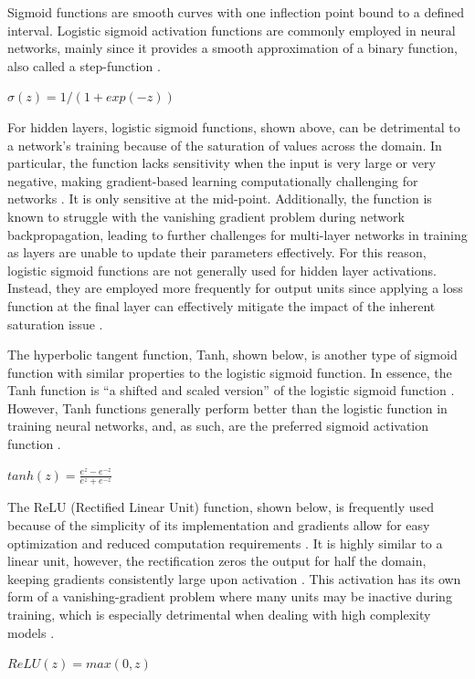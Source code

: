 \documentclass{article}
\begin{document}
Sigmoid functions are smooth curves with one inflection point bound to a defined interval. Logistic sigmoid activation functions are commonly employed in neural networks, mainly since it provides a smooth approximation of a binary function, also called a step-function \cite{lederer2021activation}. 
\newline
\newline
\centerline{$\sigma(z)=1/(1+exp(-z))$}
\newline

For hidden layers, logistic sigmoid functions, shown above, can be detrimental to a network’s training because of the saturation of values across the domain. In particular, the function lacks sensitivity when the input is very large or very negative, making gradient-based learning computationally challenging for networks \cite{Goodfellow-et-al-2016}. It is only sensitive at the mid-point. Additionally, the function is known to struggle with the vanishing gradient problem during network backpropagation, leading to further challenges for multi-layer networks in training as layers are unable to update their parameters effectively. For this reason, logistic sigmoid functions are not generally used for hidden layer activations. Instead, they are employed more frequently for output units since applying a loss function at the final layer can effectively mitigate the impact of the inherent saturation issue \cite{Goodfellow-et-al-2016}. 

The hyperbolic tangent function, Tanh, shown below, is another type of sigmoid function with similar properties to the logistic sigmoid function. In essence, the Tanh function is “a shifted and scaled version” of the logistic sigmoid function \cite{lederer2021activation}. However, Tanh functions generally perform better than the logistic function in training neural networks, and, as such, are the preferred sigmoid activation function \cite{Goodfellow-et-al-2016}.  
\newline
\newline
\centerline{$tanh(z) = \frac{e^{z} - e^{-z}}{e^{z} + e^{-z}}$}
\newline

The ReLU (Rectified Linear Unit) function, shown below, is frequently used because of the simplicity of its implementation and gradients allow for easy optimization and reduced computation requirements \cite{lederer2021activation,Goodfellow-et-al-2016}. It is highly similar to a linear unit, however, the rectification zeros the output for half the domain, keeping gradients consistently large upon activation \cite{Goodfellow-et-al-2016}. This activation has its own form of a vanishing-gradient problem where many units may be inactive during training, which is especially detrimental when dealing with high complexity models \cite{lederer2021activation}. 
\newline
\newline
\centerline{$ReLU(z) = max(0,z)$}
\newline
\end{document}
